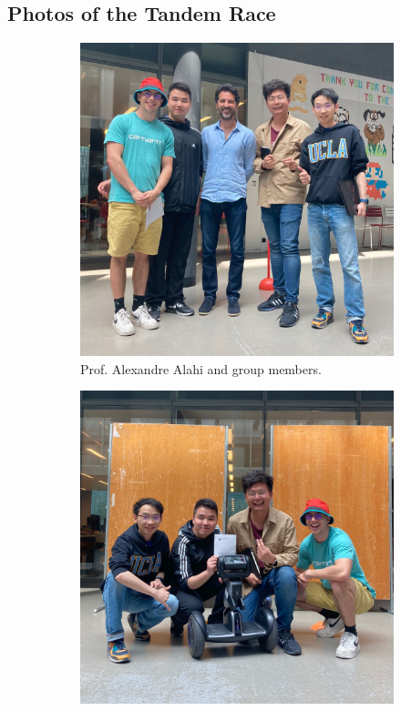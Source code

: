 \documentclass[10pt,conference,compsocconf]{IEEEtran}
\begin{document}
\begin{appendices}
\section{Photos of the Tandem Race} \label{sec:TandemRace}
\begin{figure}[!ht]
  \centering
  \begin{subfigure}{0.4\textwidth}
    \includegraphics[width=\linewidth]{Image/Photo1.jpeg}
    \caption{Prof. Alexandre Alahi and group members.}
  \end{subfigure}
  \hfil
  \begin{subfigure}{0.4\textwidth}
    \includegraphics[width=\linewidth]{Image/Photo2.jpeg}

\end{subfigure}
\end{figure}
\end{appendices}
\end{document}
